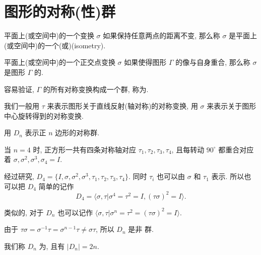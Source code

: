 \section{图形的对称(性)群}

\begin{definition}
	平面上(或空间中)的一个变换 $\sigma$ 如果保持任意两点的距离不变, 那么称 $\sigma$ 是平面上(或空间中)的一个(或)(isometry).
\end{definition}

\begin{definition}
	平面上(或空间中)的一个正交点变换 $\sigma$ 如果使得图形 $\Gamma$ 的像与自身重合, 那么称 $\sigma$ 是图形 $\Gamma$ 的.

	容易验证, $\Gamma$ 的所有对称变换构成一个群, 称为.
\end{definition}

我们一般用 $\tau$ 来表示图形关于直线反射(轴对称)的对称变换, 用 $\sigma$ 来表示关于图形中心旋转得到的对称变换.

用 $D_n$ 表示正 $n$ 边形的对称群.

当 $n=4$ 时, 正方形一共有四条对称轴对应 $\tau_1,\tau_2,\tau_3,\tau_4$, 且每转动 $90^\circ$ 都重合对应着 $\sigma,\sigma^2,\sigma^3,\sigma_4=I$.

经过研究, $D_4=\{I,\sigma,\sigma^2,\sigma^3,\tau_1,\tau_2,\tau_3,\tau_4\}$. 同时 $\tau_i$ 也可以由 $\sigma$ 和 $\tau_1$ 表示. 所以也可以把 $D_4$ 简单的记作 $$D_4=\langle \sigma,\tau|\sigma^4=\tau^2=I,(\tau\sigma)^2=I\rangle.$$

类似的, 对于 $D_n$ 也可以记作 $\langle \sigma,\tau|\sigma^n=\tau^2=(\tau\sigma)^2=I\rangle$.

由于 $\tau\sigma=\sigma^{-1}\tau=\sigma^{n-1}\tau\neq\sigma\tau$, 所以 $D_n$ 是非 \Abel 群.

我们称 $D_n$ 为, 且有 $|D_n|=2n$.